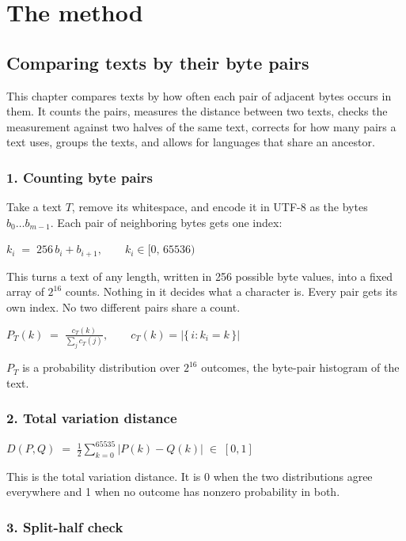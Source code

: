 \chapter{The method}

\section{Comparing texts by their byte pairs}

This chapter compares texts by how often each pair of adjacent bytes occurs in them. It counts the pairs, measures the distance between two texts, checks the measurement against two halves of the same text, corrects for how many pairs a text uses, groups the texts, and allows for languages that share an ancestor.

\subsection{1. Counting byte pairs}

Take a text \(T\), remove its whitespace, and encode it in UTF-8 as the bytes \(b_0 \dots b_{m-1}\). Each pair of neighboring bytes gets one index:

\(k_i \;=\; 256\,b_i + b_{i+1}, \qquad k_i \in [0,\,65536)\)

This turns a text of any length, written in 256 possible byte values, into a fixed array of \(2^{16}\) counts. Nothing in it decides what a character is. Every pair gets its own index. No two different pairs share a count.

\(P_T(k) \;=\; \frac{c_T(k)}{\sum_{j} c_T(j)}, \qquad c_T(k) = \bigl|\{\, i : k_i = k \,\}\bigr|\)

\(P_T\) is a probability distribution over \(2^{16}\) outcomes, the byte-pair histogram of the text.

\subsection{2. Total variation distance}

\(D(P,Q) \;=\; \tfrac{1}{2} \sum_{k=0}^{65535} \bigl| P(k) - Q(k) \bigr| \;\in\; [0,1]\)

This is the total variation distance. It is 0 when the two distributions agree everywhere and 1 when no outcome has nonzero probability in both.

\subsection{3. Split-half check}

